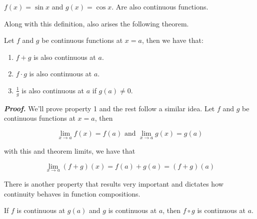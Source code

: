 \documentclass{report}
\begin{document}
\begin{Example}
    $f(x) = \sin x$ and $g(x) = \cos x$. Are also continuous functions.
\end{Example}

Along with this definition, also arises the following theorem.\\

\begin{thBox}
    Let $f$ and $g$ be continuous functions at $x=a$, then we have that:

    \begin{enumerate}
        \item $f+g$ is also continuous at $a$.
        \item $f\cdot g$ is also continuous at $a$.
        \item $\frac{1}{g}$ is also continuous at $a$ if $g(a) \not = 0$.
    \end{enumerate}
\end{thBox}

\textit{\textbf{Proof.}} We'll prove property 1 and the rest follow a similar idea. Let $f$ and $g$ be continuous functions at $x=a$, then

$$
    \lim_{x\to a} f(x) = f(a) \text{ and } \lim_{x\to a} g(x) = g(a)
$$

with this and theorem limits, we have that

$$
    \lim_{x \to a} (f+g)(x) = f(a) + g(a) = (f+g)(a)
$$

There is another property that results very important and dictates how continuity behaves in function compositions.\\
\begin{thBox}
    If $f$ is continuous at $g(a)$ and $g$ is continuous at $a$, then $f \circ g$ is continuous at $a$.
\end{thBox}
\end{document}

